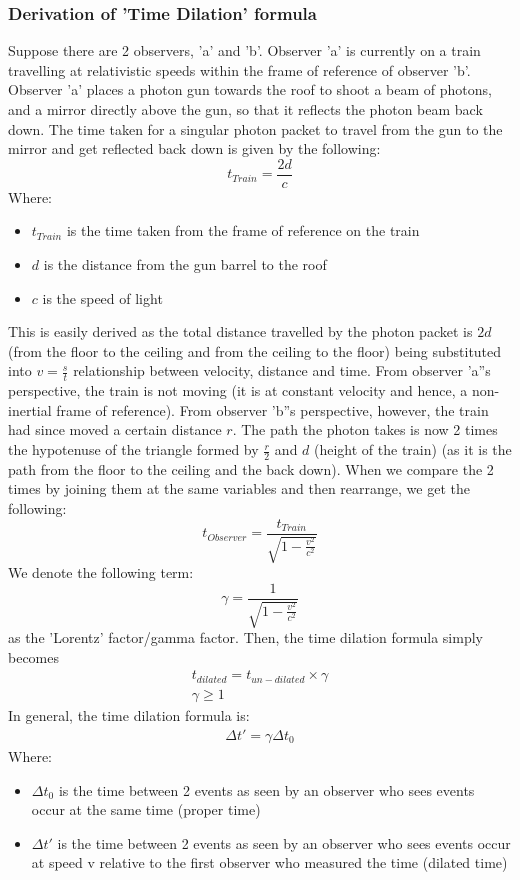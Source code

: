 \documentclass[10pt]{report}
\begin{document}
\subsubsection{Derivation of \textbf{'Time Dilation'} formula}
\par{Suppose there are 2 observers, 'a' and 'b'. Observer 'a' is currently on a train travelling at relativistic speeds within the frame of reference of observer 'b'. Observer 'a' places a photon gun towards the roof to shoot a beam of photons, and a mirror directly above the gun, so that it reflects the photon beam back down. The time taken for a singular photon packet to travel from the gun to the mirror and get reflected back down is given by the following: \[
t _{Train}=\frac{2d}{c}
\] 
Where:
\begin{itemize}
	\item{$t _{Train}$ is the time taken from the frame of reference on the train}
	\item{$d$ is the distance from the gun barrel to the roof}
	\item{$c$ is the speed of light}
\end{itemize}
This is easily derived as the total distance travelled by the photon packet is $2d$ (from the floor to the ceiling and from the ceiling to the floor) being substituted into  $v=\frac{s}{t}$ relationship between velocity, distance and time. From observer 'a''s perspective, the train is not moving (it is at constant velocity and hence, a non-inertial frame of reference). From observer 'b''s perspective, however, the train had since moved a certain distance $r$. The path the photon takes is now 2 times the hypotenuse of the triangle formed by $\frac{r}{2}$ and $d$ (height of the train) (as it is the path from the floor to the ceiling and the back down). When we compare the 2 times by joining them at the same variables and then rearrange, we get the following:
\[
t_{Observer}=\frac{t_{Train}}{\sqrt{1-\frac{v^{2}}{c^{2}}}}
\] 
We denote the following term:
\[
\gamma=\frac{1}{\sqrt{1-\frac{v^{2}}{c^{2}}}}
\] 
as the 'Lorentz' factor/gamma factor. Then, the time dilation formula simply becomes
\begin{align}
	t_{dilated}=t_{un-dilated}\times\gamma \\
	\gamma \ge 1
\end{align}
In general, the time dilation formula is:
\begin{align}
	\Delta t'=\gamma\Delta t_{0}
\end{align}
Where:
\begin{itemize}
	\item{$\Delta t_{0}$ is the time between 2 events as seen by an observer who sees events occur at the same time (proper time)}
	\item{$\Delta t'$ is the time between 2 events as seen by an observer who sees events occur at speed v relative to the first observer who measured the time (dilated time)}
\end{itemize}
}
\end{document}
